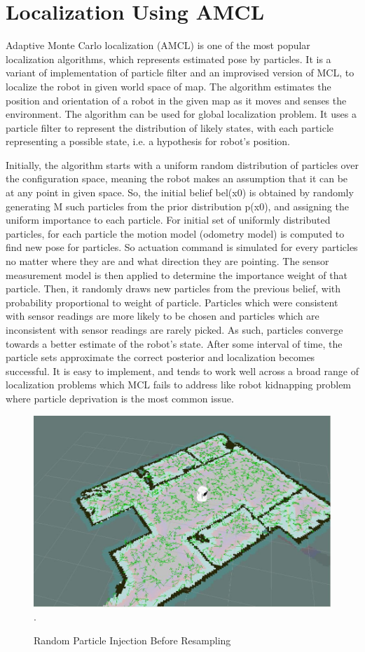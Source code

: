 \documentclass[journal,twoside]{IEEEtran}
\begin{document}
\section{Localization Using AMCL}
\noindent Adaptive Monte Carlo localization (AMCL) is one of the most popular localization algorithms, which represents estimated pose by particles. It is a variant of implementation of particle filter and an improvised version of MCL, to localize the robot in given world space of map. The algorithm estimates the position and orientation of a robot in the given map as it moves and senses the environment. The algorithm can be used for global localization problem. It uses a particle filter to represent the distribution of likely states, with each particle representing a possible state, i.e. a hypothesis for robot’s position. 
\par\noindent Initially, the algorithm starts with a uniform random distribution of particles over the configuration space, meaning the robot makes an assumption that it can be at any point in given space. So, the initial belief bel(x0) is obtained by randomly
generating M such particles from the prior distribution p(x0), and assigning the uniform importance to each particle. For initial set of uniformly distributed particles, for each particle the motion model (odometry model) is computed to find new pose for particles. So actuation command is simulated for every particles no matter where they are and what direction they are pointing. The sensor measurement model is then applied to determine the importance weight of that particle. Then, it randomly draws new particles from the previous belief, with probability proportional to weight of particle. Particles which were consistent with sensor readings are more likely to be chosen and particles which are inconsistent with
sensor readings are rarely picked. As such, particles converge towards a better estimate of the robot’s state. After some interval of time, the particle sets approximate the correct posterior and localization becomes successful. It is easy to implement, and tends to work well across a broad range of localization problems which MCL fails to address like robot kidnapping problem where particle deprivation is the most common issue.
\begin{figure}[h]
\centering
\includegraphics[scale=.27]{3.jpg}
\DeclareGraphicsExtensions.
\caption{Random Particle Injection Before Resampling}
\end{figure}
\end{document}
